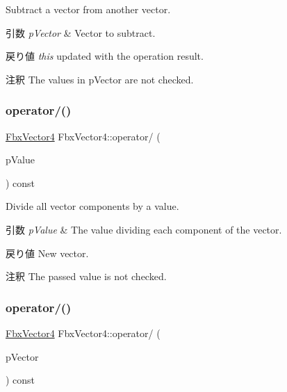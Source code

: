 Subtract a vector from another vector. 
\begin{DoxyParams}{引数}
{\em p\+Vector} & Vector to subtract. \\
\hline
\end{DoxyParams}
\begin{DoxyReturn}{戻り値}
{\itshape this} updated with the operation result. 
\end{DoxyReturn}
\begin{DoxyRemark}{注釈}
The values in p\+Vector are not checked. 
\end{DoxyRemark}
\mbox{\label{class_fbx_vector4_a202692980b2d21bc5089e3d31f40b543}} 
\subsubsection{\texorpdfstring{operator/()}{operator/()}\hspace{0.1cm}{\footnotesize\ttfamily [1/2]}}
{\footnotesize\ttfamily \hyperlink{class_fbx_vector4}{Fbx\+Vector4} Fbx\+Vector4\+::operator/ (\begin{DoxyParamCaption}\item[{double}]{p\+Value }\end{DoxyParamCaption}) const}

Divide all vector components by a value. 
\begin{DoxyParams}{引数}
{\em p\+Value} & The value dividing each component of the vector. \\
\hline
\end{DoxyParams}
\begin{DoxyReturn}{戻り値}
New vector. 
\end{DoxyReturn}
\begin{DoxyRemark}{注釈}
The passed value is not checked. 
\end{DoxyRemark}
\mbox{\label{class_fbx_vector4_ad1477f8303d7649b10864ba8c721309c}} 
\subsubsection{\texorpdfstring{operator/()}{operator/()}\hspace{0.1cm}{\footnotesize\ttfamily [2/2]}}
{\footnotesize\ttfamily \hyperlink{class_fbx_vector4}{Fbx\+Vector4} Fbx\+Vector4\+::operator/ (\begin{DoxyParamCaption}\item[{const \hyperlink{class_fbx_vector4}{Fbx\+Vector4} \&}]{p\+Vector }\end{DoxyParamCaption}) const}

